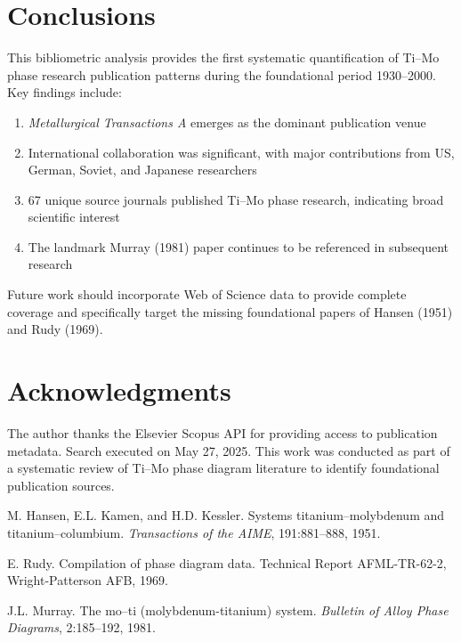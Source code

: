 \documentclass[11pt,a4paper]{article}
\begin{document}
\section{Conclusions}

This bibliometric analysis provides the first systematic quantification of Ti--Mo phase research publication patterns during the foundational period 1930--2000. Key findings include:

\begin{enumerate}
    \item \textit{Metallurgical Transactions A} emerges as the dominant publication venue
    \item International collaboration was significant, with major contributions from US, German, Soviet, and Japanese researchers
    \item 67 unique source journals published Ti--Mo phase research, indicating broad scientific interest
    \item The landmark Murray (1981) paper continues to be referenced in subsequent research
\end{enumerate}

Future work should incorporate Web of Science data to provide complete coverage and specifically target the missing foundational papers of Hansen (1951) and Rudy (1969).

\section*{Acknowledgments}

The author thanks the Elsevier Scopus API for providing access to publication metadata. Search executed on May 27, 2025. This work was conducted as part of a systematic review of Ti--Mo phase diagram literature to identify foundational publication sources.

\begin{thebibliography}{3}

M. Hansen, E.L. Kamen, and H.D. Kessler.
\newblock Systems titanium--molybdenum and titanium--columbium.
\newblock \textit{Transactions of the AIME}, 191:881--888, 1951.

E. Rudy.
\newblock Compilation of phase diagram data.
\newblock Technical Report AFML-TR-62-2, Wright-Patterson AFB, 1969.

J.L. Murray.
\newblock The mo--ti (molybdenum-titanium) system.
\newblock \textit{Bulletin of Alloy Phase Diagrams}, 2:185--192, 1981.

\end{thebibliography}
\end{document}
